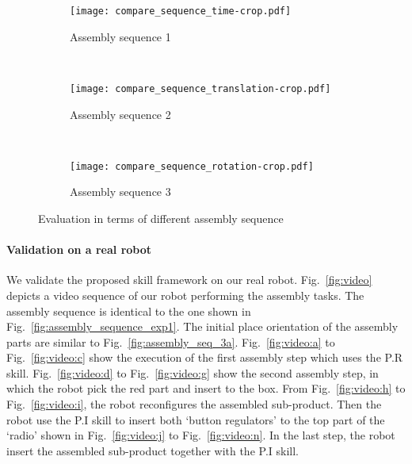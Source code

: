 \begin{figure}[!htbp]
\captionsetup[subfigure]{position=b}
    \centering
    \begin{subfigure}[t]{0.4\textwidth}
        \texttt{[image: compare\_sequence\_time-crop.pdf]}
        \caption{Assembly sequence 1}
        \label{fig:compare_sequence_assemby_sequence_1}
    \end{subfigure}
    ~
    \begin{subfigure}[t]{0.4\textwidth}
        \texttt{[image: compare\_sequence\_translation-crop.pdf]}
        \caption{Assembly sequence 2 }
        \label{fig:compare_sequence_assemby_sequence_2}
    \end{subfigure}
    ~
    \begin{subfigure}[t]{0.4\textwidth}
        \texttt{[image: compare\_sequence\_rotation-crop.pdf]}
        \caption{Assembly sequence 3 }
        \label{fig:compare_sequence_assemby_sequence_3}
    \end{subfigure}
    \caption{Evaluation in terms of different assembly sequence}\label{fig:compare_sequence_config_moveit}
\end{figure} 

\paragraph{Validation on a real robot}
We validate the proposed skill framework on our real robot. Fig.~\ref{fig:video} depicts a video sequence of our robot performing the assembly tasks. The assembly sequence is identical to the one shown in Fig.~\ref{fig:assembly_sequence_exp1}. The initial place orientation of the assembly parts are similar to Fig.~\ref{fig:assembly_seq_3a}. Fig.~\ref{fig:video:a} to Fig.~\ref{fig:video:c} show the execution of the first assembly step which uses the P.R skill. Fig.~\ref{fig:video:d} to Fig.~\ref{fig:video:g} show the second assembly step, in which the robot pick the red part and insert to the box. From  Fig.~\ref{fig:video:h} to Fig.~\ref{fig:video:i}, the robot reconfigures the assembled sub-product. Then the robot use the P.I skill to insert both `button regulators' to the top part of the `radio' shown in Fig.~\ref{fig:video:j} to Fig.~\ref{fig:video:n}. In the last step, the robot insert the assembled sub-product together with the P.I skill. 


